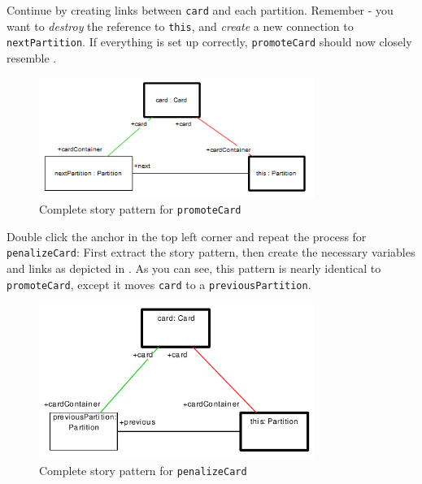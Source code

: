 \begin{stepbystep}
\vspace{0.5cm}

\item Continue by creating links between \texttt{card} and each partition. Remember - you want to \emph{destroy} the reference to
\texttt{this}, and \emph{create} a new connection to \texttt{nextPartition}. If everything is set up correctly, \texttt{promoteCard} should now closely resemble
.

\begin{figure}[htbp]
\begin{center}
  \includegraphics[width=0.8\textwidth]{../../org.moflon.doc.handbook.03_storyDiagrams/04_checkCard/visCheImages/ea_promoteCardCompleted}
  \caption{Complete story pattern for \texttt{promoteCard}}
  \label{ea:sdm_check_complete_activity_node}
\end{center}
\end{figure}

\clearpage

\item Double click the anchor in the top left corner and repeat the process for \texttt{penalizeCard}: First extract the story pattern,
then create the necessary variables and links as depicted in . As you can see, this pattern is nearly identical to
\texttt{promoteCard}, except it moves \texttt{card} to a \texttt{previousPartition}.

\vspace{0.5cm}

\begin{figure}[htbp]
\begin{center}
  \includegraphics[width=0.8\textwidth]{../../org.moflon.doc.handbook.03_storyDiagrams/04_checkCard/visCheImages/ea_completeActivityPenalize.pdf}
  \caption{Complete story pattern for \texttt{penalizeCard}}
  \label{ea:sdm_check_complete_penalize}
\end{center}
\end{figure}



\end{stepbystep}
